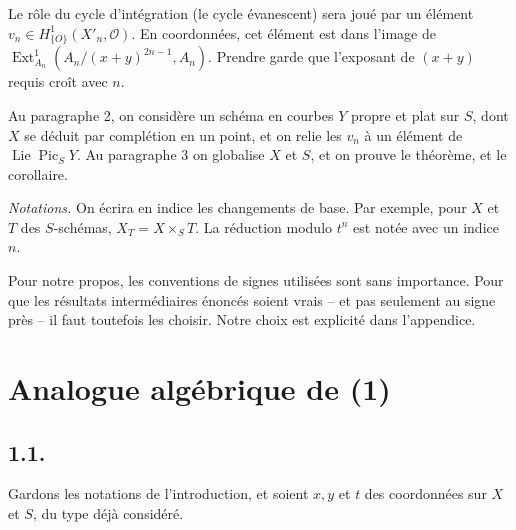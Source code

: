 \documentclass[11pt]{article}
\DeclareMathOperator{\Lie}{Lie}
\DeclareMathOperator{\Pic}{Pic}
\DeclareMathOperator{\Ext}{Ext}
\newcommand{\OO}{\mathcal O}
\begin{document}
Le rôle du cycle d'intégration (le cycle évanescent) sera joué par un élément $v_n\in H^1_{\{O\}}(X'_n,\OO)$. En coordonnées, cet élément est dans l'image de $\Ext^1_{A_n}(A_n/(x+y)^{2n-1},A_n)$. Prendre garde que l'exposant de $(x+y)$ requis croît avec $n$.

Au paragraphe 2, on considère un schéma en courbes $Y$ propre et plat sur $S$, dont $X$ se déduit par complétion en un point, et on relie les $v_n$ à un élément de $\Lie\Pic_S Y$. Au paragraphe 3 on globalise $X$ et $S$, et on prouve le théorème, et le corollaire.

\medskip
\noindent\emph{Notations.} On écrira en indice les changements de base. Par exemple, pour $X$ et $T$ des $S$-schémas, $X_T=X\times_ST$. La réduction modulo $t^n$ est notée avec un indice $n$.

Pour notre propos, les conventions de signes utilisées sont sans importance. Pour que les résultats intermédiaires énoncés soient vrais -- et pas seulement au signe près -- il faut toutefois les choisir. Notre choix est explicité dans l'appendice.

\section{Analogue algébrique de (1)}

\subsection*{1.1.}
Gardons les notations de l'introduction, et soient $x,y$ et $t$ des coordonnées sur $X$ et $S$, du type déjà considéré.
\end{document}
